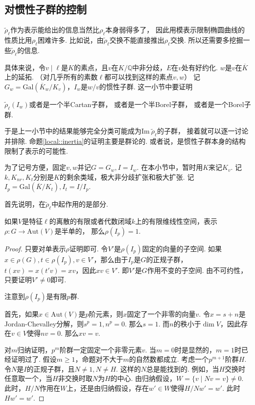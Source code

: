 \subsection{对惯性子群的控制}

$\tilde{\rho}_{\ell}$作为表示能给出的信息当然比$\rho_{\ell}$本身弱得多了，
因此用模表示限制椭圆曲线的性质比用$\rho_{\ell}$困难许多.
比如说，由$\tilde{\rho}_{\ell}$交换不能直接推出$\rho_{\ell}$交换.
所以还需要多挖掘一些$\tilde{\rho}_{\ell}$的信息.

具体来说，令$v\mid \ell$是$K$的素点，且$v$在$K/\mathbb{Q}$中非分歧，$E$在$v$处有好约化.
$w$是$v$在$\overline{K}$上的延拓.
（对几乎所有的素数$\ell$都可以找到这样的素点$v, w$）
记$G_w=\mathrm{Gal}(\overline{K}_w/K_v)$，$I_w$是$w/v$的惯性子群.
这一小节中要证明
\begin{cprop}
    $\tilde{\rho}_{\ell}(I_w)$或者是一个半Cartan子群，
    或者是一个半Borel子群，
    或者是一个Borel子群. \label{local::inertia}
\end{cprop}

于是上一小节中的结果能够完全分类可能成为$\mathrm{Im}\ \tilde{\rho}_{\ell}$的子群，
接着就可以逐一讨论并排除.
命题\ref{local::inertia}的证明主要是群论的. 或者说，是惯性子群本身的结构限制了表示的可能性.

为了记号方便，固定$v,w$并记$G = G_w, I = I_w$.
在本小节中，暂时用$K$来记$K_v$. 记$k,K_{nr},K_{t}$分别是$K$的剩余类域，极大非分歧扩张和极大\tame 扩张.
记$I_p = \mathrm{Gal}(\overline{K}/K_t), I_t = I/I_p$.

首先说明，在$\tilde{\rho}_{\ell}$中起作用的是\tame 部分.

\begin{cprop}
    如果$V$是特征$\ell$的离散的有限或者代数闭域$k$上的有限维线性空间，表示$\rho: G\to \mathrm{Aut}(V)$是半单的，
    那么$\rho(I_p) = 1$.
\end{cprop}

\begin{proof}
    只要对单表示$\rho$证明即可. 令$V'$是$\rho(I_p)$固定的向量的子空间.
    如果$x\in \rho(G),t\in \rho(I_p), v\in V'$，那么由于$I_p$是$G$的正规子群，
    $t(xv) = x(t'v)=xv$，因此$xv\in V'$. 即$V'$是$G$作用不变的子空间.
    由不可约性，只要证明$V'\neq 0$即可.
    
    注意到$\rho(I_p)$是有限$p$群.

    首先，如果$x\in\mathrm{Aut}(V)$是$p$阶元素，则$x$固定了一个非零的向量$v$.
    令$x=s+n$是Jordan-Chevalley分解，则$s^p = 1, n^p = 0$. 那么$s = 1$.
    而$n$的秩小于$\dim V$，因此存在$v\in V$使得$nv=0$. 那么$xv = v$.

    对$m$归纳证明，$p^m$阶群一定固定一个非零元素$v$. 当$m=0$时是显然的，$m=1$时已经证明过了.
    假设$m\geq 1$，命题对不大于$m$的自然数都成立. 考虑一个$p^{m+1}$阶群$H$.
    令$N$是$I$的正规子群，且$N\neq 1,N\neq H$. 这样的$N$总是能找到的.
    例如，当$H$交换时任意取一个，当$H$非交换时取$N$为$H$的中心.
    由归纳假设，$W = \{v\mid Nv=v\}\neq 0$.
    此时，$H/N$作用在$W$上，还是由归纳假设，存在$w'\in W$使得$H/N w' = w'$.
    此时$Hw' = w'$.
\end{proof}

